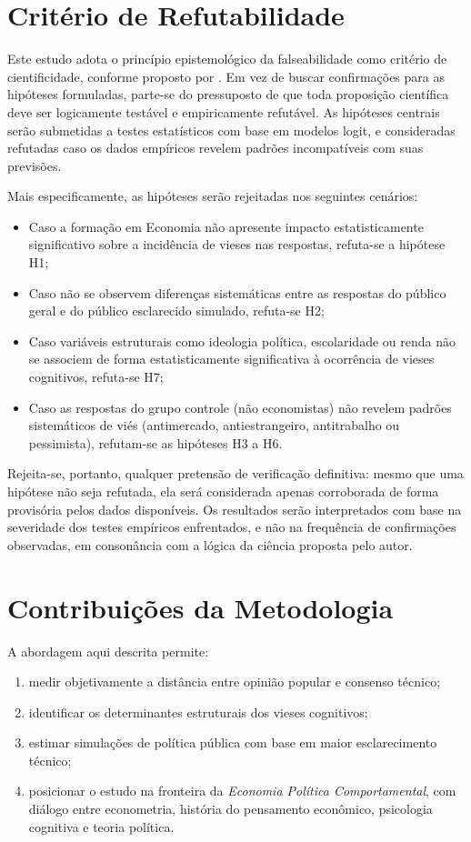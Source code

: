 \section{Critério de Refutabilidade}

Este estudo adota o princípio epistemológico da falseabilidade como critério de cientificidade, conforme proposto por . Em vez de buscar confirmações para as hipóteses formuladas, parte-se do pressuposto de que toda proposição científica deve ser logicamente testável e empiricamente refutável. As hipóteses centrais serão submetidas a testes estatísticos com base em modelos logit, e consideradas refutadas caso os dados empíricos revelem padrões incompatíveis com suas previsões.

Mais especificamente, as hipóteses serão rejeitadas nos seguintes cenários:

\begin{itemize}
    \item Caso a formação em Economia não apresente impacto estatisticamente significativo sobre a incidência de vieses nas respostas, refuta-se a hipótese H1;
    \item Caso não se observem diferenças sistemáticas entre as respostas do público geral e do público esclarecido simulado, refuta-se H2;
    \item Caso variáveis estruturais como ideologia política, escolaridade ou renda não se associem de forma estatisticamente significativa à ocorrência de vieses cognitivos, refuta-se H7;
    \item Caso as respostas do grupo controle (não economistas) não revelem padrões sistemáticos de viés (antimercado, antiestrangeiro, antitrabalho ou pessimista), refutam-se as hipóteses H3 a H6.
\end{itemize}

Rejeita-se, portanto, qualquer pretensão de verificação definitiva: mesmo que uma hipótese não seja refutada, ela será considerada apenas corroborada de forma provisória pelos dados disponíveis. Os resultados serão interpretados com base na severidade dos testes empíricos enfrentados, e não na frequência de confirmações observadas, em consonância com a lógica da ciência proposta pelo autor.


\section{Contribuições da Metodologia}

A abordagem aqui descrita permite:
\begin{enumerate}[label=\alph*)]
    \item medir objetivamente a distância entre opinião popular e consenso técnico;
    \item identificar os determinantes estruturais dos vieses cognitivos;
    \item estimar simulações de política pública com base em maior esclarecimento técnico;
    \item posicionar o estudo na fronteira da \textit{Economia Política Comportamental}, com diálogo entre econometria, história do pensamento econômico, psicologia cognitiva e teoria política.
\end{enumerate}